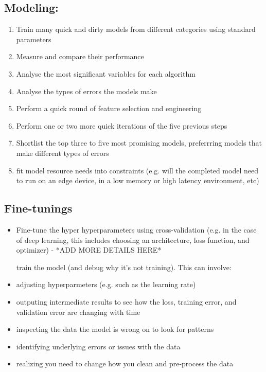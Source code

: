 \documentclass[openany]{book}
\begin{document}
\subsection{Modeling:}

\begin{enumerate}

    \item Train many quick and dirty models from different categories using standard parameters
    \item Measure and compare their performance 
    \item  Analyse the most significant variables for each algorithm
    \item Analyse the types of errors the models make 
    \item Perform a quick round of feature selection and engineering
    \item  Perform one or two more quick iterations of the five previous steps 
    \item Shortlist the top three to five most promising models, preferrring models that make different types of errors 
    \item fit model resource needs into constraints (e.g. will the completed model need to run on an edge device, in a low memory or high latency environment, etc)

\end{enumerate}

\subsection{Fine-tunings} 

\begin{itemize}
    \item Fine-tune the hyper hyperparameters using cross-validation (e.g. in the case of deep learning, this includes choosing an architecture, loss function, and optimizer) - *ADD MORE DETAILS HERE* 
    
    train the model (and debug why it’s not training). This can involve:
     
    \item adjusting hyperparmeters (e.g. such as the learning rate)
    
    \item outputing intermediate results to see how the loss, training error, and validation error are changing with time
    
    \item inspecting the data the model is wrong on to look for patterns
    
    \item identifying underlying errors or issues with the data
    
    \item realizing you need to change how you clean and pre-process the data
    
\end{itemize}
\end{document}

